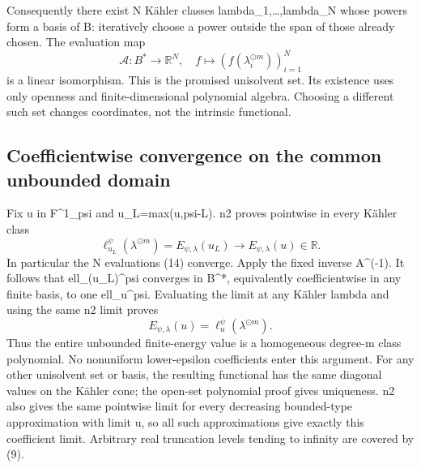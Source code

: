 \documentclass[
]{article}
\begin{document}
Consequently there exist N Kähler classes lambda\_1,\ldots,lambda\_N
whose powers form a basis of B: iteratively choose a power outside the
span of those already chosen. The evaluation map \[
\mathcal{A}:B^*\longrightarrow\mathbb{R}^N,\quad
f\longmapsto(f(\lambda_i^{\odot m}))_{i=1}^N\tag{14}
\] is a linear isomorphism. This is the promised unisolvent set. Its
existence uses only openness and finite-dimensional polynomial algebra.
Choosing a different such set changes coordinates, not the intrinsic
functional.

\subsection{Coefficientwise convergence on the common unbounded
domain}\label{coefficientwise-convergence-on-the-common-unbounded-domain}

Fix u in F\^{}1\_psi and u\_L=max(u,psi-L). n2 proves pointwise in every
Kähler class \[
\ell_{u_L}^\psi(\lambda^{\odot m})
=E_{\psi,\lambda}(u_L)\longrightarrow E_{\psi,\lambda}(u)\in\mathbb{R}.
\] In particular the N evaluations (14) converge. Apply the fixed
inverse A\^{}(-1). It follows that ell\_(u\_L)\^{}psi converges in
B\^{}*, equivalently coefficientwise in any finite basis, to one
ell\_u\^{}psi. Evaluating the limit at any Kähler lambda and using the
same n2 limit proves \[
E_{\psi,\lambda}(u)=\ell_u^\psi(\lambda^{\odot m}).\tag{15}
\] Thus the entire unbounded finite-energy value is a homogeneous
degree-m class polynomial. No nonuniform lower-epsilon coefficients
enter this argument. For any other unisolvent set or basis, the
resulting functional has the same diagonal values on the Kähler cone;
the open-set polynomial proof gives uniqueness. n2 also gives the same
pointwise limit for every decreasing bounded-type approximation with
limit u, so all such approximations give exactly this coefficient limit.
Arbitrary real truncation levels tending to infinity are covered by (9).
\end{document}
